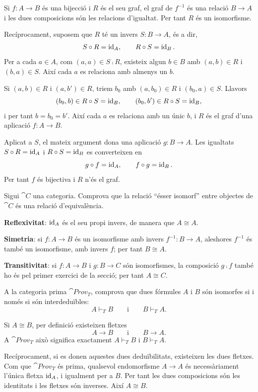 \begin{solucio}
Si $f\colon A\to B$ és una bijecció i $R$ és el seu graf, el graf de $f^{-1}$ és una relació $B\to A$ i les dues composicions són les relacions d'igualtat. Per tant $R$ és un isomorfisme.

Recíprocament, suposem que $R$ té un invers $S\colon B\to A$, és a dir,
\[
S\circ R=\operatorname{id}_A,
\qquad
R\circ S=\operatorname{id}_B.
\]
Per a cada $a\in A$, com $(a,a)\in S\comp R$, existeix algun $b\in B$ amb $(a,b)\in R$ i $(b,a)\in S$. Així cada $a$ es relaciona amb almenys un $b$.

Si $(a,b)\in R$ i $(a,b')\in R$, triem $b_0$ amb $(a,b_0)\in R$ i $(b_0,a)\in S$. Llavors
\[
(b_0,b)\in R\circ S=\operatorname{id}_B,
\qquad
(b_0,b')\in R\circ S=\operatorname{id}_B,
\]
i per tant $b=b_0=b'$. Així cada $a$ es relaciona amb un únic $b$, i $R$ és el graf d'una aplicació $f\colon A\to B$.

Aplicat a $S$, el mateix argument dona una aplicació $g\colon B\to A$. Les igualtats $S\circ R=\operatorname{id}_A$ i $R\circ S=\operatorname{id}_B$ es converteixen en
\[
g\circ f=\operatorname{id}_A,
\qquad
f\circ g=\operatorname{id}_B.
\]
Per tant $f$ és bijectiva i $R$ n'és el graf.
\end{solucio}

\begin{exercici}
Sigui $\cat{C}$ una categoria. Comprova que la relació \enquote{ésser isomorf} entre objectes de $\cat{C}$ és una relació d'equivalència.
\end{exercici}

\begin{solucio}
\textbf{Reflexivitat}: $\operatorname{id}_A$ és el seu propi invers, de manera que $A\cong A$.

\textbf{Simetria}: si $f\colon A\to B$ és un isomorfisme amb invers $f^{-1}\colon B\to A$, aleshores $f^{-1}$ és també un isomorfisme, amb invers $f$; per tant $B\cong A$.

\textbf{Transitivitat}: si $f\colon A\to B$ i $g\colon B\to C$ són isomorfismes, la composició $g\comp f$ també ho és pel primer exercici de la secció; per tant $A\cong C$.
\end{solucio}

\begin{exercici}
A la categoria prima $\cat{Prov}_T$, comprova que dues fórmules $A$ i $B$ són isomorfes si i només si són interdeduïbles:
\[
A\vdash_T B
\qquad\text{i}\qquad
B\vdash_T A.
\]
\end{exercici}

\begin{solucio}
Si $A\cong B$, per definició existeixen fletxes
\[
A\longrightarrow B
\qquad\text{i}\qquad
B\longrightarrow A.
\]
A $\cat{Prov}_T$ això significa exactament $A\vdash_T B$ i $B\vdash_T A$.

Recíprocament, si es donen aquestes dues deduïbilitats, existeixen les dues fletxes. Com que $\cat{Prov}_T$ és prima, qualsevol endomorfisme $A\to A$ és necessàriament l'única fletxa $\operatorname{id}_A$, i igualment per a $B$. Per tant les dues composicions són les identitats i les fletxes són inverses. Així $A\cong B$.
\end{solucio}

